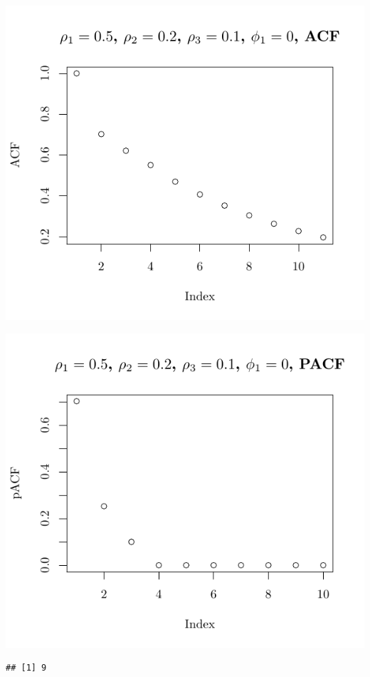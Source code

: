 \documentclass[10pt]{paper}\usepackage[]{graphicx}\usepackage[]{color}
\makeatletter
\def\maxwidth{ %
  \ifdim\Gin@nat@width>\linewidth
    \linewidth
  \else
    \Gin@nat@width
  \fi
}
\newenvironment{kframe}{%
 \def\at@end@of@kframe{}%
 \ifinner\ifhmode%
  \def\at@end@of@kframe{\end{minipage}}%
  \begin{minipage}{\columnwidth}%
 \fi\fi%
 \def\FrameCommand##1{\hskip\@totalleftmargin \hskip-\fboxsep
 \colorbox{shadecolor}{##1}\hskip-\fboxsep
     \hskip-\linewidth \hskip-\@totalleftmargin \hskip\columnwidth}%
 \MakeFramed {\advance\hsize-\width
   \@totalleftmargin\z@ \linewidth\hsize
   \@setminipage}}%
 {\par\unskip\endMakeFramed%
 \at@end@of@kframe}
\newenvironment{knitrout}{}{} %
\makeatother
\begin{document}
\begin{knitrout}
{\centering \includegraphics[width=\maxwidth]{figure/graphics-plotter-111} 

}




{\centering \includegraphics[width=\maxwidth]{figure/graphics-plotter-112} 

}


\begin{kframe}\begin{verbatim}
## [1] 9
\end{verbatim}
\end{kframe}


\end{knitrout}
\end{document}
